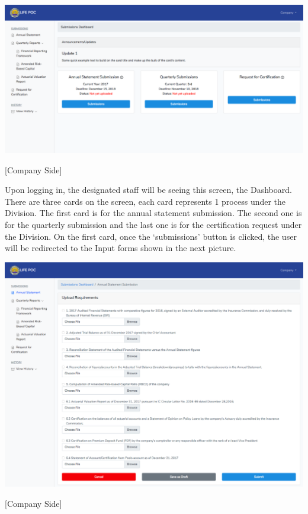 \documentclass{article}
\begin{document}
\noindent{}\includegraphics[keepaspectratio=true]{up-ic-screens/image89}{}%

[Company Side]%

Upon logging in, the designated staff will be seeing
this screen, the Dashboard. There are three cards on the screen, each
card represents 1 process under the Division. The first card is for the
annual statement submission. The second one is for the quarterly submission and the last
one is for the certification request
under the Division. On the first card, once the
‘submissions’ button is clicked, the user will be redirected to the
Input forms shown in the next picture.%

\includegraphics[keepaspectratio=true]{up-ic-screens/image142}{}%

[Company Side]%
\end{document}
